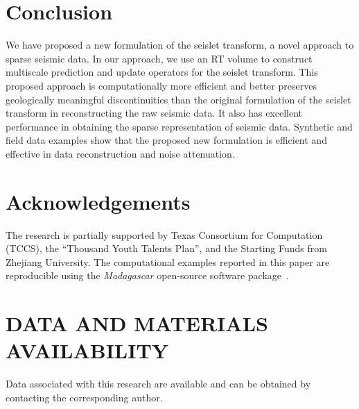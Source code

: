 \section{Conclusion}
    We have proposed a new formulation of the seislet transform, a novel 
    approach to sparse seismic data. 
    In our approach, we use an RT volume to construct multiscale prediction and 
    update operators for the seislet transform. 
    This proposed approach is computationally more efficient and better 
    preserves geologically meaningful discontinuities than the original 
    formulation of the seislet transform in reconstructing the raw seismic data. 
    It also has excellent performance in obtaining the sparse representation of
    seismic data.
    Synthetic and field data examples show that the proposed new formulation is 
    efficient and effective in data reconstruction and noise attenuation.

\section{Acknowledgements}
    The research is partially supported by Texas Consortium for Computation 
    (TCCS), the “Thousand Youth Talents Plan”, and the Starting Funds from 
    Zhejiang University. 
    The computational examples reported in this paper are reproducible using 
    the \emph{Madagascar} open-source software 
    package~\cite[]{fomel2013madagascar}. 
    
\section{DATA AND MATERIALS AVAILABILITY}
    Data associated with this research are available and can be obtained by 
    contacting the corresponding author. 

\onecolumn


